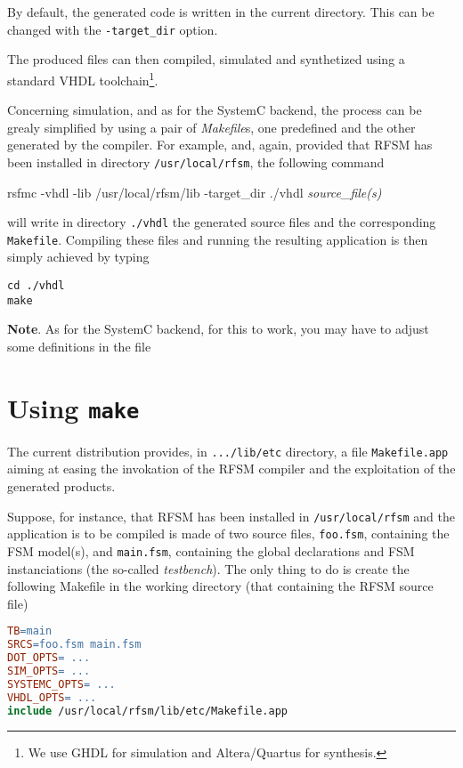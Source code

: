 \medskip
By default, the generated code is written in the current directory. This can be changed with the
\verb|-target_dir| option.

\medskip
The produced files can then compiled, simulated and synthetized using a standard VHDL
toolchain\footnote{We use GHDL for simulation and Altera/Quartus for synthesis.}.

Concerning simulation, and as for the SystemC backend, the process can be grealy simplified by using
a pair of \emph{Makefile}s, one predefined and the other generated by the compiler.  For example,
and, again, provided that RFSM has been installed in directory \verb|/usr/local/rfsm|, the following
command

\begin{FVerbatim}[commandchars=\\\{\}]
rsfmc -vhdl -lib /usr/local/rfsm/lib -target_dir ./vhdl \emph{source_file(s)}
\end{FVerbatim}

will write in directory \verb|./vhdl| the generated source files and the corresponding
\verb|Makefile|. Compiling these files and running the resulting application is then simply achieved
by typing

\begin{verbatim}
cd ./vhdl
make 
\end{verbatim}

\medskip
\textbf{Note}. As for the SystemC backend, for this to work, you may have to adjust some definitions in the file

\section{Using \texttt{make}}
\label{sec:makefile}

The current distribution provides, in \verb|.../lib/etc| directory, a file \verb|Makefile.app|
aiming at easing the invokation of the RFSM compiler and the exploitation of the generated
products.

Suppose, for instance, that RFSM has been installed in \verb|/usr/local/rfsm| and the application is
to be compiled is made of two source files, \verb|foo.fsm|, containing the FSM model(s), and
\verb|main.fsm|, containing the global declarations and FSM instanciations (the so-called
\emph{testbench}). The only thing to do is create the following Makefile in the working directory
(that containing the RFSM source file)

\begin{lstlisting}[language=make,frame=single]
TB=main
SRCS=foo.fsm main.fsm
DOT_OPTS= ...
SIM_OPTS= ...
SYSTEMC_OPTS= ...
VHDL_OPTS= ...
include /usr/local/rfsm/lib/etc/Makefile.app
\end{lstlisting}

